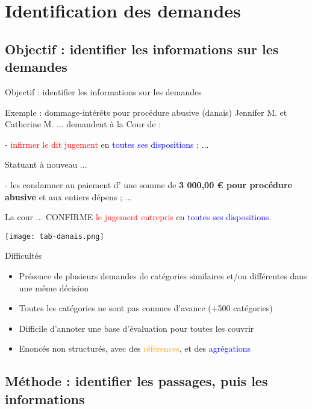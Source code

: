 \section{Identification des demandes}
\subsection{Objectif : identifier les informations sur les demandes}
\begin{frame}[c]{Objectif : identifier les informations sur les demandes}
\begin{exampleblock}{\scriptsize Exemple : dommage-intérêts pour procédure abusive (danais)}
	\scriptsize
	Jennifer M. et Catherine M. ... demandent à la Cour de :
	
	- \textcolor{red}{infirmer le dit jugement} en \textcolor{blue}{toutes ses dispositions} ; 
	...
	
	Statuant à nouveau ...
	
	- les condamner au paiement d' une somme de  \textbf{3 000,00 € pour procédure abusive} et
	aux entiers dépens ; ...
	
	La cour ... CONFIRME \textcolor{red}{le jugement entrepris} en \textcolor{blue}{toutes ses dispositions}.
	
	\centering \texttt{[image: tab-danais.png]}
\end{exampleblock}

\begin{alertblock}{\scriptsize Difficultés}
	\begin{itemize}\scriptsize 
		\item Présence de plusieurs demandes de catégories similaires et/ou différentes dans une même décision
		\item Toutes les catégories ne sont pas connues d'avance (+500 catégories)
		\item Difficile d'annoter une base d'évaluation pour toutes les couvrir
		\item Enoncés non structurés, avec des \textcolor{orange}{références}, et des  \textcolor{blue}{agrégations}
	\end{itemize}
\end{alertblock}
\end{frame}

\subsection{Méthode : identifier les passages, puis les informations}

